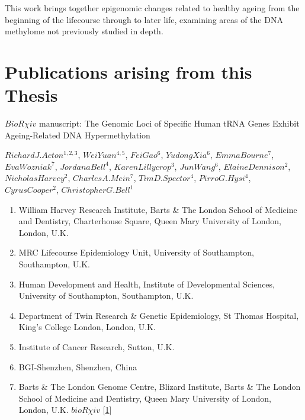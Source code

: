 \documentclass[
]{book}
\providecommand{\tightlist}{%
  \setlength{\itemsep}{0pt}\setlength{\parskip}{0pt}}
\begin{document}
This work brings together epigenomic changes related to healthy ageing from the beginning of the lifecourse through to later life, examining areas of the DNA methylome not previously studied in depth.

\newpage

\hypertarget{publications-arising-from-this-thesis}{%
\section*{Publications arising from this Thesis}\label{publications-arising-from-this-thesis}}

\(BioR\chi iv\) manuscript: The Genomic Loci of Specific Human tRNA Genes Exhibit Ageing-Related DNA Hypermethylation

\(Richard J. Acton ^{1,2,3}\), \(Wei Yuan ^{4,5}\), \(Fei Gao ^{6}\), \(Yudong Xia ^{6}\), \(Emma Bourne ^{7}\), \(Eva Wozniak ^{7}\), \(Jordana Bell ^{4}\), \(Karen Lillycrop ^{3}\), \(Jun Wang ^{6}\), \(Elaine Dennison ^{2}\), \(Nicholas Harvey ^{2}\), \(Charles A. Mein ^{7}\), \(Tim D. Spector ^{4}\), \(Pirro G. Hysi ^{4}\), \(Cyrus Cooper ^{2}\), \(Christopher G. Bell ^{1}\)

\begin{enumerate}
\def\labelenumi{\arabic{enumi}.}
\tightlist
\item
  William Harvey Research Institute, Barts \& The London School of Medicine and Dentistry, Charterhouse Square, Queen Mary University of London, London, U.K.
\item
  MRC Lifecourse Epidemiology Unit, University of Southampton, Southampton, U.K.
\item
  Human Development and Health, Institute of Developmental Sciences, University of Southampton, Southampton, U.K.\\
\item
  Department of Twin Research \& Genetic Epidemiology, St Thomas Hospital, King's College London, London, U.K.
\item
  Institute of Cancer Research, Sutton, U.K.
\item
  BGI-Shenzhen, Shenzhen, China
\item
  Barts \& The London Genome Centre, Blizard Institute, Barts \& The London School of Medicine and Dentistry, Queen Mary University of London, London, U.K.
  \href{https://doi.org/10.1101/870352}{\(bioR \chi iv\)} {[}\protect\hyperlink{ref-Acton2020}{1}{]}
\end{enumerate}
\end{document}

